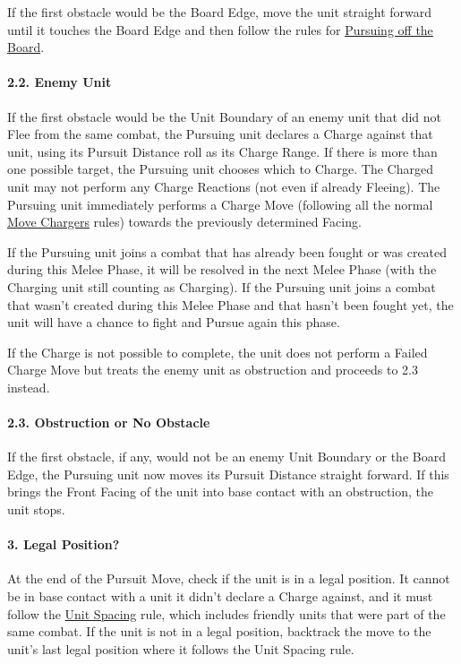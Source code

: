 If the first obstacle would be the Board Edge, move the unit straight forward until it touches the Board Edge and then follow the rules for \hyperref[pursuing_off_the_board]{Pursuing off the Board}.

\paragraph{2.2. Enemy Unit}

If the first obstacle would be the Unit Boundary of an enemy unit that did not Flee from the same combat, the Pursuing unit declares a Charge against that unit, using its Pursuit Distance roll as its Charge Range. If there is more than one possible target, the Pursuing unit chooses which to Charge. The Charged unit may not perform any Charge Reactions (not even if already Fleeing). The Pursuing unit immediately performs a Charge Move (following all the normal \hyperref[move_chargers]{Move Chargers} rules) towards the previously determined Facing.
\par
If the Pursuing unit joins a combat that has already been fought or was created during this Melee Phase, it will be resolved in the next Melee Phase (with the Charging unit still counting as Charging). If the Pursuing unit joins a combat that wasn't created during this Melee Phase and that hasn't been fought yet, the unit will have a chance to fight and Pursue again this phase.
\par
If the Charge is not possible to complete, the unit does not perform a Failed Charge Move but treats the enemy unit as obstruction and proceeds to 2.3 instead.

\paragraph{2.3. Obstruction or No Obstacle}

If the first obstacle, if any, would not be an enemy Unit Boundary or the Board Edge, the Pursuing unit now moves its Pursuit Distance straight forward. If this brings the Front Facing of the unit into base contact with an obstruction, the unit stops.

\newpage
\paragraph{3. Legal Position?}

At the end of the Pursuit Move, check if the unit is in a legal position. It cannot be in base contact with a unit it didn't declare a Charge against, and it must follow the \hyperref[unit_spacing]{Unit Spacing} rule, which includes friendly units that were part of the same combat. If the unit is not in a legal position, backtrack the move to the unit's last legal position where it follows the Unit Spacing rule.

